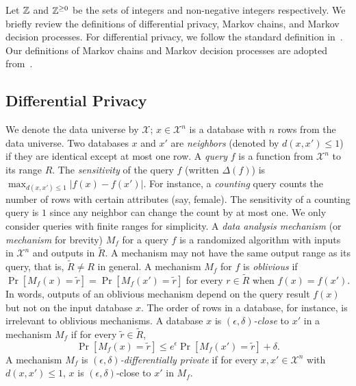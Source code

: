 
Let $\mathbb{Z}$ and $\mathbb{Z}^{\geq 0}$ be the sets of integers and
non-negative integers respectively.
We briefly review the definitions of differential privacy, Markov
chains, and Markov decision processes. For differential privacy, we
follow the standard definition in~\cite{DR:14:AFDP,GRS:09:UUPM,GRS:12:UUPM}. Our
definitions of Markov chains and Markov decision processes are adopted
from~\cite{BK:08:PMC}.

\subsection{Differential Privacy}
We denote the data universe by $\mathcal{X}$; $x \in \mathcal{X}^n$ is
a database with $n$ rows from the data universe. Two databases $x$ and
$x'$ are \emph{neighbors} (denoted by $d(x, x') \leq 1$) if they are
identical except at most one row. A \emph{query} $f$ is a function
from $\mathcal{X}^n$ to its range $R$. The \emph{sensitivity} of the
query $f$ (written $\Delta (f)$) is $\max_{d(x, x') \leq 1} | f (x) -
f (x') |$. For instance, a \emph{counting} query counts the number
of rows with certain attributes (say, female). The sensitivity of a
counting query is $1$ since any neighbor can change the count by at
most one. We only consider queries with finite  ranges for simplicity.
A \emph{data analysis mechanism} (or
\emph{mechanism} for brevity) $M_f$ for a query $f$
is a randomized algorithm with inputs in $\mathcal{X}^n$ and outputs
in $\tilde{R}$.
A mechanism may not have the same output range as its query, that is,
$\tilde{R} \neq R$ in general.
A mechanism $M_f$ for $f$ is \emph{oblivious} if
$\Pr[M_f(x) = \tilde{r}] = \Pr[M_f(x') = \tilde{r}]$ for every
$r \in \tilde{R}$ when $f (x) = f (x')$. In words, outputs of an
oblivious mechanism depend on the query result $f (x)$ but not on the
input database $x$. The order of rows in a database, for instance, is
irrelevant to oblivious mechanisms. A database $x$ is
\emph{$(\epsilon, \delta)$-close} to $x'$ in a mechanism
$M_f$ if for every $\tilde{r} \in \tilde{R}$,
\[
\Pr[M_f (x) = \tilde{r}] \leq e^{\epsilon} \Pr[M_f (x') =
\tilde{r}] + \delta.
\]
A mechanism $M_f$ is \emph{$(\epsilon, \delta)$-differentially
  private} %
if for every $x, x' \in \mathcal{X}^n$ with $d(x, x') \leq 1$,
$x$ is $(\epsilon, \delta)$-close to $x'$ in $M_f$.

